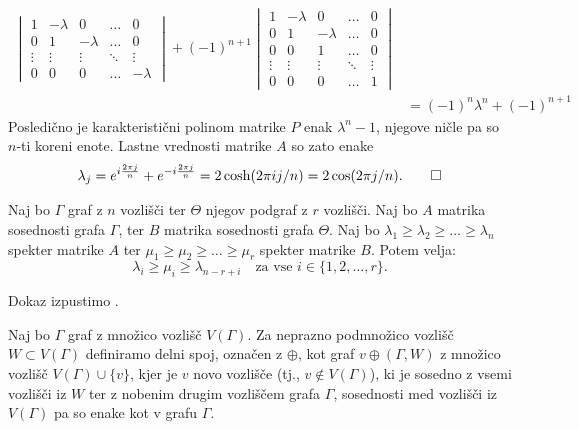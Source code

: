 \documentclass[fin1, tisk]{fmfdelo}
\begin{document}
\begin{dokaz}
\begin{align*}
\begin{vmatrix}
            1 & -\lambda & 0 & \dots & 0 \\ 
            0 & 1 & -\lambda & \dots & 0 \\ 
            \vdots & \vdots & \vdots & \ddots & \vdots \\ 
            0 & 0 & 0 & \dots & -\lambda  \end{vmatrix}
            + (-1)^{n+1} \begin{vmatrix} 
            1 & -\lambda & 0 & \dots & 0 \\ 
            0 & 1 & -\lambda & \dots & 0 \\ 
            0 & 0 & 1 & \dots & 0 \\ 
            \vdots & \vdots & \vdots & \ddots & \vdots \\ 
            0 & 0 & 0 & \dots & 1  \end{vmatrix} \\
            &= (-1)^n \lambda^n + (-1)^{n+1}
    \end{align*}
    Posledično je karakteristični polinom matrike $P$ enak $\lambda^n - 1$, njegove ničle pa
    so $n$-ti koreni enote. Lastne vrednosti matrike $A$ so zato enake 
    \[\lambda_j = e^{i \frac{2\pi j}{n}} + e^{-i \frac{2\pi j}{n}} = 2\cosh(2\pi i j/n) = 2\cos(2\pi j/n).\qedhere\]
\end{dokaz}

\begin{izrek}\label{iz:interlacing}
Naj bo $\Gamma$ graf z $n$ vozlišči ter $\Theta$ njegov podgraf z $r$ vozlišči. Naj bo 
$A$ matrika sosednosti grafa $\Gamma$, ter $B$ matrika sosednosti grafa $\Theta$. Naj bo
$\lambda_1 \geq \lambda_2 \geq \ldots \geq \lambda_n$ spekter matrike $A$ 
ter $\mu_1 \geq \mu_2 \geq \ldots \geq \mu_r$ spekter matrike $B$. Potem velja:
\[
\lambda_i \geq \mu_i \geq \lambda_{n - r + i} \quad \text{za vse } i \in \{1, 2, \ldots, r\}.
\]
\end{izrek}
\begin{dokaz}
    Dokaz izpustimo \cite{enwiki1325771674}.
\end{dokaz}

\begin{definicija}\label{def:delni_spoj}
    Naj bo $\Gamma$ graf z množico vozlišč $V(\Gamma)$. Za
    neprazno podmnožico vozlišč $W \subset V(\Gamma)$ definiramo delni spoj, označen z $\oplus$, 
    kot graf $v \oplus (\Gamma, W)$ z množico vozlišč $V(\Gamma) \cup \{v\}$, kjer je $v$ novo vozlišče (tj., $v\not\in V(\Gamma)$), ki je sosedno z vsemi 
    vozlišči iz $W$ ter z nobenim drugim vozliščem grafa $\Gamma$,
    sosednosti med vozlišči iz $V(\Gamma)$ pa so enake kot v grafu $\Gamma$.
\end{definicija}
\end{document}
